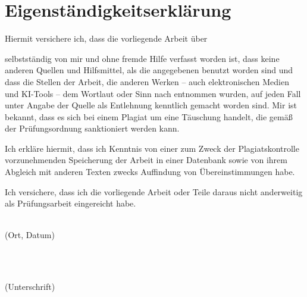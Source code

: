 \chapter*{Eigenständigkeitserklärung}
Hiermit versichere ich, dass die vorliegende Arbeit über

\begin{center}
  \itshape
  \printtitle
\end{center}

selbstständig von mir und ohne fremde Hilfe verfasst worden ist, dass keine anderen Quellen und Hilfsmittel, als die angegebenen benutzt worden sind und dass die Stellen der Arbeit, die anderen Werken -- auch elektronischen Medien und KI-Tools -- dem Wortlaut oder Sinn nach entnommen wurden, auf jeden Fall unter Angabe der Quelle als Entlehnung kenntlich gemacht worden sind.
Mir ist bekannt, dass es sich bei einem Plagiat um eine Täuschung handelt, die gemäß der Prüfungsordnung sanktioniert werden kann.

Ich erkläre hiermit, dass ich Kenntnis von einer zum Zweck der Plagiatskontrolle vorzunehmenden Speicherung der Arbeit in einer Datenbank sowie von ihrem Abgleich mit anderen Texten zwecks Auffindung von Übereinstimmungen habe.

Ich versichere, dass ich die vorliegende Arbeit oder Teile daraus nicht anderweitig als Prüfungsarbeit eingereicht habe. 

\vspace*{2cm}

\begin{minipage}{0.5\textwidth}
  \begin{flushleft} \large
    \underline{\hspace{6cm}} \\
    {\footnotesize (Ort, Datum)}
  \end{flushleft}
\end{minipage}
~
\begin{minipage}{0.5\textwidth}
  \begin{flushright} \large
    \underline{\hspace{6cm}} \\
    {\footnotesize (Unterschrift)}
  \end{flushright}
\end{minipage}\\[0.5cm]